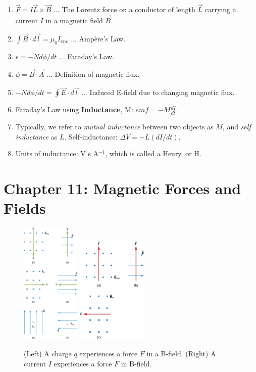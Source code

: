 \documentclass[10pt]{article}
\begin{document}
\begin{enumerate}
\item $\vec{F} = I\vec{L} \times \vec{B}$ ... The Lorentz force on a conductor of length $\vec{L}$ carrying a current $I$ in a magnetic field $\vec{B}$.
\item $\int \vec{B} \cdot d\vec{l} = \mu_0 I_{enc}$ ... Amp\`{e}re's Law.
\item $\epsilon = -N d\phi/dt$ ... Faraday's Law.
\item $\phi = \vec{B} \cdot \vec{A}$ ... Definition of magnetic flux.
\item $-N d\phi/dt = \oint \vec{E} \cdot d\vec{l}$ ... Induced E-field due to changing magnetic flux.
\item Faraday's Law using \textbf{Inductance}, M: $emf = -M \frac{dI}{dt}$.
\item Typically, we refer to \textit{mutual inductance} between two objects as $M$, and \textit{self inductance} as $L$.  Self-inductance: $\Delta V = -L (dI/dt)$.
\item Units of inductance: V s A$^{-1}$, which is called a Henry, or H.
\end{enumerate}

\clearpage

\section{Chapter 11: Magnetic Forces and Fields}

\begin{figure}
\centering
\includegraphics[width=0.25\textwidth]{lorentzDir.jpeg} \hspace{0.5cm}
\includegraphics[width=0.3\textwidth]{lorentzDirCurrent.jpeg}
\caption{\label{fig:chap11_1} (Left) A charge $q$ experiences a force $F$ in a B-field. (Right) A current $I$ experiences a force $F$ in B-field.}
\end{figure}
\end{document}
